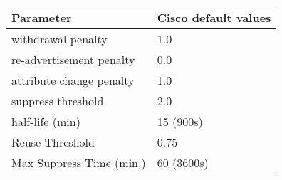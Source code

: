 \begin{center}
	\begin{tabular}{ || m{5cm}| m{4cm} || } 
	\hline
	Parameter & Cisco default values\\ 
	\hline \hline
	withdrawal penalty & 1.0 \\
	\hline
    re-advertisement penalty & 0.0 \\
	\hline
    attribute change penalty & 1.0 \\
	\hline
    suppress threshold & 2.0 \\
	\hline
    half-life (min) & 15 (900s) \\
	\hline
    Reuse Threshold & 0.75 \\
	\hline
    Max Suppress Time (min.) & 60 (3600s) \\
	\hline
	\end{tabular}
\end{center}
